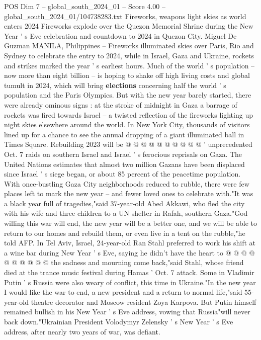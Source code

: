 \begin{textsample}{POS Dim 7 – global\_south\_2024\_01 – Score 4.00 – global\_south\_2024\_01/104738283.txt}  \label{ex:f7_pos_313}
Fireworks, weapons light skies as world enters 2024 Fireworks explode over the Quezon Memorial Shrine during the New Year ' s Eve celebration and countdown to 2024 in Quezon City.
Miguel De Guzman MANILA, Philippines -- Fireworks illuminated skies over Paris, Rio and Sydney to celebrate the entry to 2024, while in Israel, Gaza and Ukraine, rockets and strikes marked the year ' s earliest hours.
Much of the world ' s population -- now more than eight billion -- is hoping to shake off high living costs and global tumult in 2024, which will bring \textbf{elections} concerning half the world ' s population and the Paris Olympics.
But with the new year barely started, there were already ominous signs : at the stroke of midnight in Gaza a barrage of rockets was fired towards Israel -- a twisted reflection of the fireworks lighting up night skies elsewhere around the world.
In New York City, thousands of visitors lined up for a chance to see the annual dropping of a giant illuminated ball in Times Square.
Rebuilding 2023 will be @ @ @ @ @ @ @ @ @ @ ' unprecedented Oct. 7 raids on southern Israel and Israel ' s ferocious reprisals on Gaza.
The United Nations estimates that almost two million Gazans have been displaced since Israel ' s siege began, or about 85 percent of the peacetime population.
With once-bustling Gaza City neighborhoods reduced to rubble, there were few places left to mark the new year -- and fewer loved ones to celebrate with."It was a black year full of tragedies,"said 37-year-old Abed Akkawi, who fled the city with his wife and three children to a UN shelter in Rafah, southern Gaza."God willing this war will end, the new year will be a better one, and we will be able to return to our homes and rebuild them, or even live in a tent on the rubble,"he told AFP.
In Tel Aviv, Israel, 24-year-old Ran Stahl preferred to work his shift at a wine bar during New Year ' s Eve, saying he didn't have the heart to @ @ @ @ @ @ @ @ @ @ the sadness and mourning come back,"said Stahl, whose friend died at the trance music festival during Hamas ' Oct. 7 attack.
Some in Vladimir Putin ' s Russia were also weary of conflict, this time in Ukraine."In the new year I would like the war to end, a new president and a return to normal life,"said 55-year-old theatre decorator and Moscow resident Zoya Karpova.
But Putin himself remained bullish in his New Year ' s Eve address, vowing that Russia"will never back down."Ukrainian President Volodymyr Zelensky ' s New Year ' s Eve address, after nearly two years of war, was defiant.

\end{textsample}
